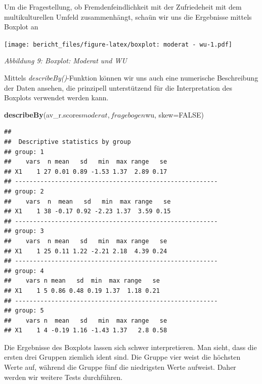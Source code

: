 \documentclass[]{article}
\newenvironment{Shaded}{\begin{snugshade}}{\end{snugshade}}
\newcommand{\KeywordTok}[1]{\textcolor[rgb]{0.13,0.29,0.53}{\textbf{{#1}}}}
\newcommand{\DataTypeTok}[1]{\textcolor[rgb]{0.13,0.29,0.53}{{#1}}}
\newcommand{\StringTok}[1]{\textcolor[rgb]{0.31,0.60,0.02}{{#1}}}
\newcommand{\OtherTok}[1]{\textcolor[rgb]{0.56,0.35,0.01}{{#1}}}
\newcommand{\NormalTok}[1]{{#1}}
\begin{document}
Um die Fragestellung, ob Fremdenfeindlichkeit mit der Zufriedeheit mit
dem multikulturellen Umfeld zusammenhängt, schaün wir uns die Ergebnisse
mittels Boxplot an

\begin{Shaded}
\end{Shaded}

\texttt{[image: bericht\_files/figure-latex/boxplot: moderat - wu-1.pdf]}

\begin{center}
\textit{Abbildung 9: Boxplot: Moderat und WU}
\bigskip
\end{center}

Mittels \emph{describeBy()}-Funktion können wir uns auch eine numerische
Beschreibung der Daten ansehen, die prinzipell unterstützend für die
Interpretation des Boxplots verwendet werden kann.

\begin{Shaded}
\begin{Highlighting}[]
\KeywordTok{describeBy}\NormalTok{(av_r.scores$moderat, fragebogen$wu, }\DataTypeTok{skew=}\OtherTok{FALSE}\NormalTok{)}
\end{Highlighting}
\end{Shaded}

\begin{verbatim}
## 
##  Descriptive statistics by group 
## group: 1
##    vars  n mean   sd   min  max range   se
## X1    1 27 0.01 0.89 -1.53 1.37  2.89 0.17
## -------------------------------------------------------- 
## group: 2
##    vars  n  mean   sd   min  max range   se
## X1    1 38 -0.17 0.92 -2.23 1.37  3.59 0.15
## -------------------------------------------------------- 
## group: 3
##    vars  n mean   sd   min  max range   se
## X1    1 25 0.11 1.22 -2.21 2.18  4.39 0.24
## -------------------------------------------------------- 
## group: 4
##    vars n mean   sd  min  max range   se
## X1    1 5 0.86 0.48 0.19 1.37  1.18 0.21
## -------------------------------------------------------- 
## group: 5
##    vars n  mean   sd   min  max range   se
## X1    1 4 -0.19 1.16 -1.43 1.37   2.8 0.58
\end{verbatim}

Die Ergebnisse des Boxplots lassen sich schwer interpretieren. Man
sieht, dass die ersten drei Gruppen ziemlich ident sind. Die Gruppe vier
weist die höchsten Werte auf, während die Gruppe fünf die niedrigsten
Werte aufweist. Daher werden wir weitere Tests durchführen.
\end{document}
